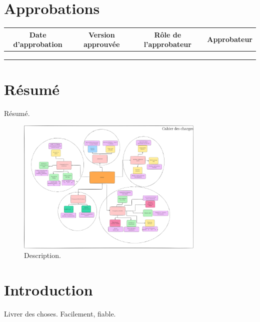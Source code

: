 \documentclass[a4paper,12pt]{report}  %
\begin{document}
	\section*{Approbations}
	\begin{table}[h]
		\begin{tabular}{|c|c|c|c|} 
			\hline
			\textbf{Date d'approbation} & \textbf{Version approuvée} & \textbf{Rôle de l'approbateur} & \textbf{Approbateur} \\
			\hline
			& & & \\
			\hline
			& & & \\
			\hline
			& & & \\
			\hline
		\end{tabular}
	\end{table}
	
		
	\tableofcontents
	
	\pagebreak
	
	\section{Résumé}
	
	Résumé. 
	
	\begin{figure}[h]
		\centering
		\includegraphics[width=0.8\textwidth]{./attachements/Untitled-2025-06-11-1251_B.pdf}
		\caption{Description. }
		\label{fig:your_label}
	\end{figure}
	
	\section{Introduction}
	Livrer des choses. Facilement, fiable. 
	
\end{document}
